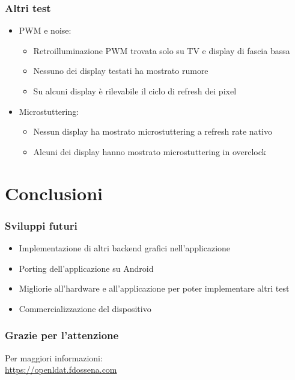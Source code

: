 \documentclass[xcolor={x11names}]{beamer}
\begin{document}
\begin{frame}[fragile,shrink=20]
\begin{minipage}[c][\paperheight][c]{\textwidth}
\begin{minipage}{0.33\textwidth}
\begin{figure}
			\end{figure}
		\end{minipage}
	\end{minipage}
\end{frame}
\begin{frame}
	\frametitle{Altri test}
	\begin{itemize}
		\setlength\itemsep{4mm}
		\item PWM e noise: \begin{itemize}
			\item \alert{Retroilluminazione PWM trovata solo su TV e display di fascia bassa}
			\item Nessuno dei display testati ha mostrato rumore
			\item \alert{Su alcuni display è rilevabile il ciclo di refresh dei pixel}
		\end{itemize}
		\item Microstuttering: \begin{itemize}
			\item \alert{Nessun display ha mostrato microstuttering a refresh rate nativo}
			\item Alcuni dei display hanno mostrato microstuttering in overclock
		\end{itemize}
	\end{itemize}
\end{frame}

\section{Conclusioni}
\begin{frame}
	\frametitle{Sviluppi futuri}
	\begin{itemize}
        \item Implementazione di \alert{altri backend grafici} nell'applicazione
        \item Porting dell'applicazione su Android
        \item Migliorie all'hardware e all'applicazione per poter implementare \alert{altri test}
        \item \alert{Commercializzazione del dispositivo}
	\end{itemize}
\end{frame}
\begin{frame}
	\frametitle{Grazie per l'attenzione}
	\centering
	Per maggiori informazioni:\\
	\alert{\url{https://openldat.fdossena.com}}
\end{frame}
\end{document}
